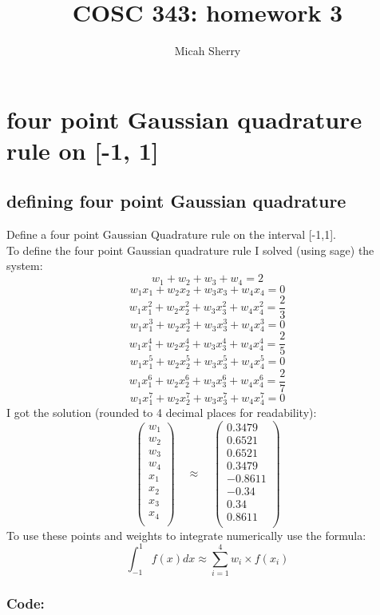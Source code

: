 \documentclass{article}
\title{COSC 343: homework 3}
\author{Micah Sherry}
\begin{document}
\maketitle
\section{four point Gaussian quadrature rule on [-1, 1]}
\subsection{defining four point Gaussian quadrature}
	Define a four point Gaussian Quadrature rule on the interval [-1,1].
	\\To define the four point Gaussian quadrature rule I solved (using sage) the system:
	$$ w_1 + w_2 + w_3 + w_4 = 2 $$
	$$ w_1x_1 + w_2x_2 + w_3x_3 + w_4x_4 = 0 $$
	$$ w_1x_1^2 + w_2x_2^2 + w_3x_3^2 + w_4x_4^2 = \frac{2}{3} $$
	$$ w_1x_1^3 + w_2x_2^3 + w_3x_3^3 + w_4x_4^3 = 0 $$
	$$ w_1x_1^4 + w_2x_2^4 + w_3x_3^4 + w_4x_4^4 = \frac{2}{5} $$
	$$ w_1x_1^5 + w_2x_2^5 + w_3x_3^5 + w_4x_4^5 = 0 $$
	$$ w_1x_1^6 + w_2x_2^6 + w_3x_3^6 + w_4x_4^6 = \frac{2}{7} $$
	$$ w_1x_1^7 + w_2x_2^7 + w_3x_3^7 + w_4x_4^7 = 0 $$
	I got the solution (rounded to 4 decimal places for readability):
	$$\begin{pmatrix}
		w_1 \\	w_2 \\	w_3 \\	w_4 \\	x_1 \\	x_2 \\	x_3 \\	x_4 \\
	\end{pmatrix}
	\quad \approx \quad
	\begin{pmatrix}
		0.3479 \\0.6521 \\0.6521 \\0.3479 \\-0.8611 \\-0.34\\0.34 \\0.8611 \\
	\end{pmatrix}$$
	To use these points and weights to integrate numerically use the formula:
	$$\int_{-1}^{1}f(x)dx \approx \sum_{i=1}^{4}w_i\times f(x_i)$$
	\subsubsection*{Code:}
		
\end{document}
